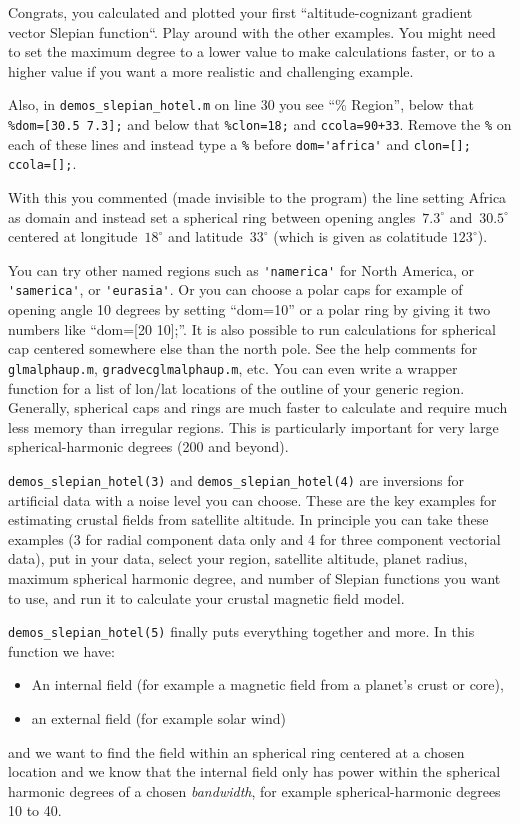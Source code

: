 \documentclass[11pt]{article}
\begin{document}
Congrats, you calculated and plotted your first ``altitude-cognizant
gradient vector Slepian function``. Play around with the other
examples. You might need to set the maximum degree to a lower value to
make calculations faster, or to a higher value if you want a more
realistic and challenging example.

Also, in \verb#demos_slepian_hotel.m# on line 30 you see ``\% Region'',
below that \verb+%dom=[30.5 7.3];+ and below that \verb+%clon=18;+ and
\verb#ccola=90+33#. Remove the \verb+%+ on each of these lines and
instead type a \verb+%+ before \verb+dom='africa'+ and
\verb+clon=[]; ccola=[];+.

With this you commented (made invisible to the program) the line
setting Africa as domain and instead set a spherical ring between
opening angles~$7.3^\circ$ and~$30.5^\circ$ centered at
longitude~$18^\circ$ and latitude~$33^\circ$ (which is given as
colatitude $123^\circ$).

You can try other named regions such as \verb#'namerica'# for North America,
or \verb#'samerica'#, or \verb#'eurasia'#. Or you can choose a polar caps for
example of opening angle 10 degrees by setting ``dom=10'' or a polar
ring by giving it two numbers like ``dom=[20 10];''. It is also
possible to run calculations for spherical cap centered somewhere else
than the north pole. See the help comments for \verb+glmalphaup.m+,
\verb+gradvecglmalphaup.m+, etc. You can even write a wrapper function
for a list of lon/lat locations of the outline of your generic
region. Generally, spherical caps and rings are much faster to
calculate and require much less memory than irregular regions. This is
particularly important for very large spherical-harmonic degrees (200
and beyond).

\verb+demos_slepian_hotel(3)+ and \verb+demos_slepian_hotel(4)+ are inversions for
artificial data with a noise level you can choose. These are the key
examples for estimating crustal fields from satellite altitude. In
principle you can take these examples (3 for radial component data
only and 4 for three component vectorial data), put in your data,
select your region, satellite altitude, planet radius, maximum
spherical harmonic degree, and number of Slepian functions you want to
use, and run it to calculate your crustal magnetic field model.

\verb+demos_slepian_hotel(5)+ finally puts everything together and
more. In this function we have:

\begin{itemize}
  \item An internal field (for example a
    magnetic field from a planet's crust or core),
  \item an external field (for example solar wind)
\end{itemize}
and we want to find the field within an spherical ring centered at a
chosen location and we know that the internal field only has power
within the spherical harmonic degrees of a chosen \emph{bandwidth},
for example spherical-harmonic degrees 10 to 40.
\end{document}
